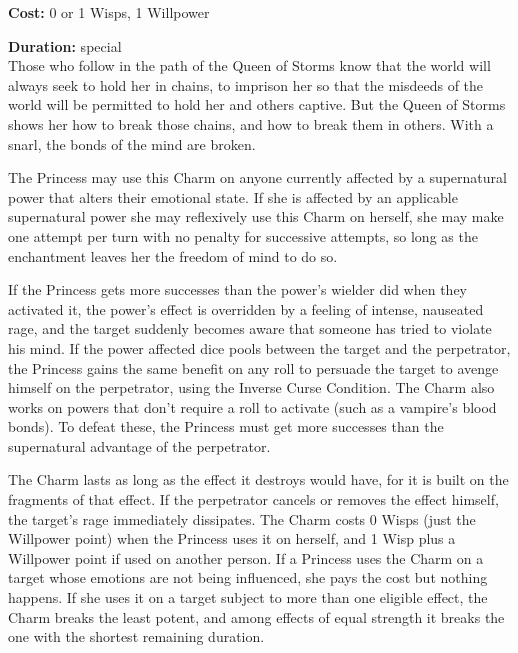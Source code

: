 \noindent \textbf{Cost:} 0 or 1 Wisps, 1 Willpower

\noindent \textbf{Duration:} special \\

\noindent Those who follow in the path of the Queen of Storms know that the world will always seek to hold her in chains, to imprison her so that the misdeeds of the world will be permitted to hold her and others captive. But the Queen of Storms shows her how to break those chains, and how to break them in others. With a snarl, the bonds of the mind are broken.

The Princess may use this Charm on anyone currently affected by a supernatural power that alters their emotional state. If she is affected by an applicable supernatural power she may reflexively use this Charm on herself, she may make one attempt per turn with no penalty for successive attempts, so long as the enchantment leaves her the freedom of mind to do so.

If the Princess gets more successes than the power's wielder did when they activated it, the power's effect is overridden by a feeling of intense, nauseated rage, and the target suddenly becomes aware that someone has tried to violate his mind. If the power affected dice pools between the target and the perpetrator, the Princess gains the same benefit on any roll to persuade the target to avenge himself on the perpetrator, using the Inverse Curse Condition. The Charm also works on powers that don't require a roll to activate (such as a vampire's blood bonds). To defeat these, the Princess must get more successes than the supernatural advantage of the perpetrator.

The Charm lasts as long as the effect it destroys would have, for it is built on the fragments of that effect. If the perpetrator cancels or removes the effect himself, the target's rage immediately dissipates. The Charm costs 0 Wisps (just the Willpower point) when the Princess uses it on herself, and 1 Wisp plus a Willpower point if used on another person. If a Princess uses the Charm on a target whose emotions are not being influenced, she pays the cost but nothing happens. If she uses it on a target subject to more than one eligible effect, the Charm breaks the least potent, and among effects of equal strength it breaks the one with the shortest remaining duration.

